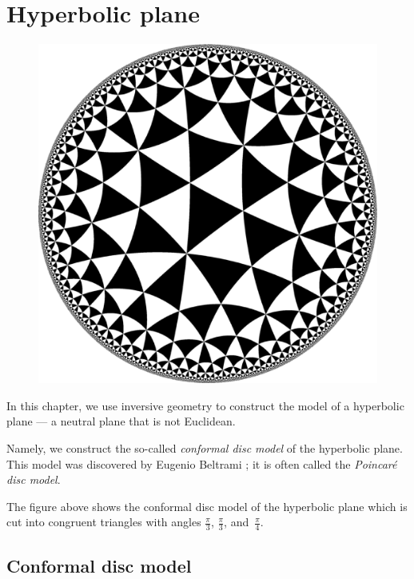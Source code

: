 \chapter{Hyperbolic plane}\label{chap:poincare}

\begin{figure}[!ht]
\vspace*{-9mm}
\centering
\includegraphics[scale=0.25]{pics/H2checkers_334}
\end{figure}

In this chapter, we use inversive geometry 
to construct the model of a hyperbolic plane --- a neutral plane that is not Euclidean.

Namely, we construct the so-called \emph{conformal disc model} of the hyperbolic plane.
This model was discovered by Eugenio Beltrami \cite{beltrami}; 
it is often called the {}\emph{Poincar\'e disc model}. 

The figure above shows the conformal disc model of the hyperbolic plane which is cut into congruent triangles with angles $\tfrac\pi3$, $\tfrac\pi3$, and~$\tfrac\pi4$.

\section{Conformal disc model}
\label{sec:conformal-model}

